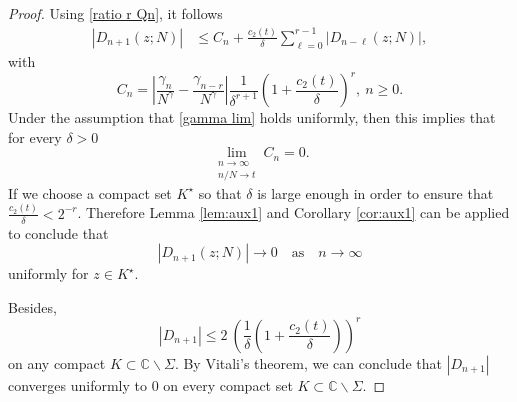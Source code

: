 \documentclass[10pt,a4paper]{amsart}
\begin{document}
\begin{proof}
Using \eqref{ratio r Qn}, it follows 
\begin{align}\label{Dn ineq}
	\left| D_{n+1}(z;N) \right| 
		& \leq
		C_n+  \frac{c_2(t)}{\delta} \sum_{\ell = 0} ^{r-1}  \left| D_{n-\ell} (z;N) \right| , 
\end{align}
with 
\begin{equation*}
	C_{n} =\left|  \frac{\gamma_{n}}{N^\gamma} - \frac{\gamma_{n-r}}{N^\gamma}  \right| 
				\frac{1}{\delta^{r+1}}  \left( 1 + \frac{c_2(t)}{\delta}\right)^r, \ n\geq 0. 
\end{equation*}
Under the assumption that \eqref{gamma lim} holds uniformly, then this implies that for every $\delta>0$
\[
	\lim_{\substack{n\to\infty\\ n/N\to t}} C_n =0. 
\]
If we choose a compact set $K^\star$ so that $\delta$ is large enough in order to ensure that $ \frac{c_2(t)}{\delta} < 2^{-r} $. Therefore Lemma \ref{lem:aux1} and Corollary \ref{cor:aux1} can be applied to conclude that 
\[ 
|D_{n+1}(z;N)|\to 0 \quad \text{as}\quad n\to \infty
\] 
uniformly for $z\in K^\star$. 

Besides, 
\[
	|D_{n+1} | %
		\leq 2 \ \left(\frac{1}{\delta} \left( 1 + \frac{c_2(t)}{\delta}\right)\right)^{r}
\]
on any compact $K\subset \mathbb{C}\backslash \Sigma$. By Vitali's theorem, we can conclude that $|D_{n+1}|$ converges uniformly to $0$ on every compact set $K\subset \mathbb{C}\backslash \Sigma$. 
\end{proof}
\end{document}
